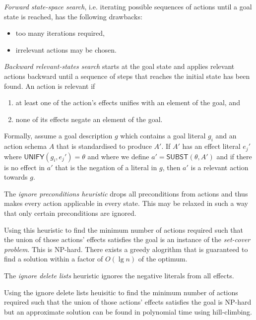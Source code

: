 \documentclass{article}
\begin{document}
\begin{theorem}[R\&N, p. 373]
    \emph{Forward state-space search}, i.e. iterating possible sequences of
    actions until a goal state is reached, has the following drawbacks:
    \begin{itemize}
        \item too many iterations required,
        \item irrelevant actions may be chosen.
    \end{itemize}
\end{theorem}

\begin{definition}
    \emph{Backward relevant-states search} starts at the goal state and applies
    relevant actions backward until a sequence of steps that reaches the initial
    state has been found. An action is relevant if
    \begin{enumerate}
        \item at least one of the action's effects unifies with an element of the goal, and
        \item none of its effects negate an element of the goal.
    \end{enumerate}
    Formally, assume a goal description $g$
    which contains a goal literal $g_i$ and an action schema $A$ that is standardised
    to produce $A'$. If $A'$ has an effect literal $e_j'$ where $\textsf{UNIFY}(g_i,e_j')=\theta$
    and where we define $a'=\textsf{SUBST}(\theta, A')$ and if there is no effect in
    $a'$ that is the negation of a literal in $g$, then $a'$ is a relevant action towards
    $g$.
\end{definition}

\begin{theorem}[R\&N p. 376]
    The \emph{ignore preconditions heuristic} drops all preconditions from actions
    and thus makes every action applicable in every state. This may be relaxed in
    such a way that only certain preconditions are ignored.

    Using this heuristic to find the minimum number of
    actions required such that the union of those actions'
    effects satisfies the goal is an instance of the \emph{set-cover problem}. This
    is NP-hard. There exists a greedy alogrithm that is guaranteed to find a solution
    within a factor of $O(\lg n)$ of the optimum.
\end{theorem}

\begin{theorem}[R\&N p. 377]
    The \emph{ignore delete lists} heuristic ignores the negative literals from all
    effects.

    Using the ignore delete lists heuisitic to find the minimum number of actions
    required such that the union of those actions' effects satisfies the goal
    is NP-hard but an approximate solution can be found in polynomial time using
    hill-climbing.
\end{theorem}
\end{document}
